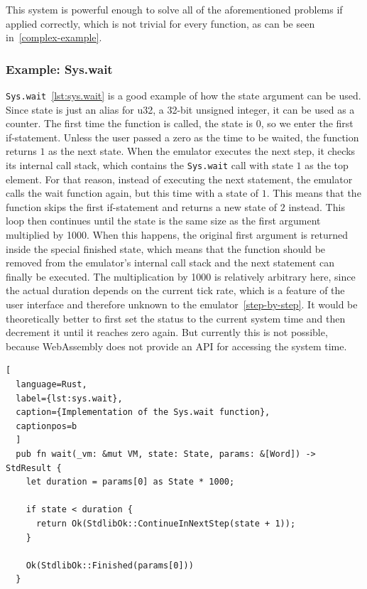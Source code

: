 This system is powerful enough to solve all of the aforementioned problems if applied correctly, which is not trivial for every function, as can be seen in~\cref{complex-example}.
\subsubsection{Example: Sys.wait} \label{sys.wait-example}
\verb+Sys.wait+~\ref{lst:sys.wait} is a good example of how the state argument can be used.
Since state is just an alias for u32, a 32-bit unsigned integer, it can be used as a counter.
The first time the function is called, the state is \(0\), so we enter the first if-statement.
Unless the user passed a zero as the time to be waited, the function returns \(1\) as the next state.
When the emulator executes the next step, it checks its internal call stack, which contains the \verb+Sys.wait+ call with state \(1\) as the top element.
For that reason, instead of executing the next statement, the emulator calls the wait function again, but this time with a state of \(1\).
This means that the function skips the first if-statement and returns a new state of \(2\) instead.
This loop then continues until the state is the same size as the first argument multiplied by 1000.
When this happens, the original first argument is returned inside the special finished state, which means that the function should be removed from the emulator's internal call stack and the next statement can finally be executed.
The multiplication by 1000 is relatively arbitrary here, since the actual duration depends on the current tick rate, which is a feature of the user interface and therefore unknown to the emulator~\ref{step-by-step}.
It would be theoretically better to first set the status to the current system time and then decrement it until it reaches zero again.
But currently this is not possible, because WebAssembly does not provide an API for accessing the system time.

\begin{lstlisting}[
  language=Rust,
  label={lst:sys.wait},
  caption={Implementation of the Sys.wait function},
  captionpos=b
  ]
  pub fn wait(_vm: &mut VM, state: State, params: &[Word]) -> StdResult {
    let duration = params[0] as State * 1000;

    if state < duration {
      return Ok(StdlibOk::ContinueInNextStep(state + 1));
    }

    Ok(StdlibOk::Finished(params[0]))
  }
\end{lstlisting}

